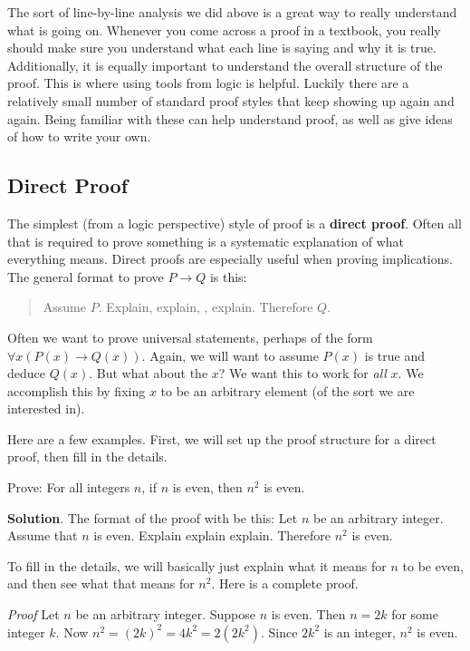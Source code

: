 \documentclass[11pt,]{book}
\makeatletter
\newcommand{\terminology}[1]{\textbf{#1}}
\theoremstyle{ptxplainnotitle}
\theoremstyle{ptxplaintitle}
\renewcommand*{\proofname}{Proof}
\renewenvironment{proof}[1][\proofname]{\par
  \pushQED{\qed}%
  \normalfont \topsep6\p@\@plus6\p@\relax
  \trivlist
  \item\relax
    {\itshape
    #1\@addpunct{.}}\hspace\labelsep\ignorespaces
}{%
  \popQED\endtrivlist\@endpefalse
}
\theoremstyle{ptxdefinitionnotitle}
\theoremstyle{ptxdefinitiontitle}
\theoremstyle{ptxdefinitionnotitle}
\theoremstyle{ptxdefinitiontitle}
\theoremstyle{ptxdefinitionnotitle}
\theoremstyle{ptxdefinitiontitle}
\theoremstyle{ptxdefinitiontitlenonumber}
\theoremstyle{ptxdefinitiontitlenonumber}
\numberwithin{equation}{chapter}
\newcommand{\imp}{\rightarrow}
\makeatother
\begin{document}
\par
\hypertarget{p-2533}{}%
The sort of line-by-line analysis we did above is a great way to really understand what is going on. Whenever you come across a proof in a textbook, you really should make sure you understand what each line is saying and why it is true. Additionally, it is equally important to understand the overall structure of the proof. This is where using tools from logic is helpful. Luckily there are a relatively small number of standard proof styles that keep showing up again and again. Being familiar with these can help understand proof, as well as give ideas of how to write your own.%
\typeout{************************************************}
\typeout{************************************************}
\subsection[{Direct Proof}]{Direct Proof}\label{subsection-22}
\hypertarget{p-2534}{}%
%
\par
\hypertarget{p-2535}{}%
The simplest (from a logic perspective) style of proof is a \terminology{direct proof}. Often all that is required to prove something is a systematic explanation of what everything means. Direct proofs are especially useful when proving implications. The general format to prove \(P \imp Q\) is this:%
\begin{quote}\hypertarget{blockquote-10}{}
\hypertarget{p-2536}{}%
Assume \(P\). Explain, explain, \textellipsis{}, explain. Therefore \(Q\).%
\end{quote}
\hypertarget{p-2537}{}%
Often we want to prove universal statements, perhaps of the form \(\forall x (P(x) \imp Q(x))\). Again, we will want to assume \(P(x)\) is true and deduce \(Q(x)\). But what about the \(x\)? We want this to work for \emph{all} \(x\). We accomplish this by fixing \(x\) to be an arbitrary element (of the sort we are interested in).%
\par
\hypertarget{p-2538}{}%
Here are a few examples. First, we will set up the proof structure for a direct proof, then fill in the details.%
\begin{example}\label{example-63}
\hypertarget{p-2539}{}%
Prove: For all integers \(n\), if \(n\) is even, then \(n^2\) is even.%
\par\smallskip%
\noindent\textbf{Solution}.\hypertarget{solution-287}{}\quad%
\hypertarget{p-2540}{}%
The format of the proof with be this: Let \(n\) be an arbitrary integer. Assume that \(n\) is even. Explain explain explain. Therefore \(n^2\) is even.%
\par
\hypertarget{p-2541}{}%
To fill in the details, we will basically just explain what it means for \(n\) to be even, and then see what that means for \(n^2\). Here is a complete proof.%
\begin{proof}\hypertarget{proof-25}{}
\hypertarget{p-2542}{}%
Let \(n\) be an arbitrary integer. Suppose \(n\) is even. Then \(n = 2k\) for some integer \(k\). Now \(n^2 = (2k)^2 = 4k^2 = 2(2k^2)\). Since \(2k^2\) is an integer, \(n^2\) is even.%
\end{proof}
\end{example}
\end{document}
